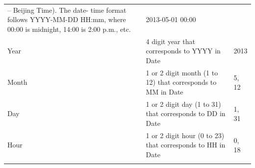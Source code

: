\documentclass[12pt,]{article}
\begin{document}
\begin{longtable}[]{@{}lll@{}}
\begin{minipage}[t]{0.60\columnwidth}
-- Beijing Time). The date- time format follows YYYY-MM-DD HH:mm, where
00:00 is midnight, 14:00 is 2:00 p.m., etc.\strut
\end{minipage} & \begin{minipage}[t]{0.11\columnwidth}\raggedright\strut
2013-05-01 00:00\strut
\end{minipage}\tabularnewline
\begin{minipage}[t]{0.14\columnwidth}\raggedright\strut
Year\strut
\end{minipage} & \begin{minipage}[t]{0.60\columnwidth}\raggedright\strut
4 digit year that corresponds to YYYY in Date\strut
\end{minipage} & \begin{minipage}[t]{0.11\columnwidth}\raggedright\strut
2013\strut
\end{minipage}\tabularnewline
\begin{minipage}[t]{0.14\columnwidth}\raggedright\strut
Month\strut
\end{minipage} & \begin{minipage}[t]{0.60\columnwidth}\raggedright\strut
1 or 2 digit month (1 to 12) that corresponds to MM in Date\strut
\end{minipage} & \begin{minipage}[t]{0.11\columnwidth}\raggedright\strut
5, 12\strut
\end{minipage}\tabularnewline
\begin{minipage}[t]{0.14\columnwidth}\raggedright\strut
Day\strut
\end{minipage} & \begin{minipage}[t]{0.60\columnwidth}\raggedright\strut
1 or 2 digit day (1 to 31) that corresponds to DD in Date\strut
\end{minipage} & \begin{minipage}[t]{0.11\columnwidth}\raggedright\strut
1, 31\strut
\end{minipage}\tabularnewline
\begin{minipage}[t]{0.14\columnwidth}\raggedright\strut
Hour\strut
\end{minipage} & \begin{minipage}[t]{0.60\columnwidth}\raggedright\strut
1 or 2 digit hour (0 to 23) that corresponds to HH in Date\strut
\end{minipage} & \begin{minipage}[t]{0.11\columnwidth}\raggedright\strut
0, 18\strut
\end{minipage}\tabularnewline
\begin{minipage}[t]{0.14\columnwidth}\raggedright\strut

\end{minipage}
\end{longtable}
\end{document}
